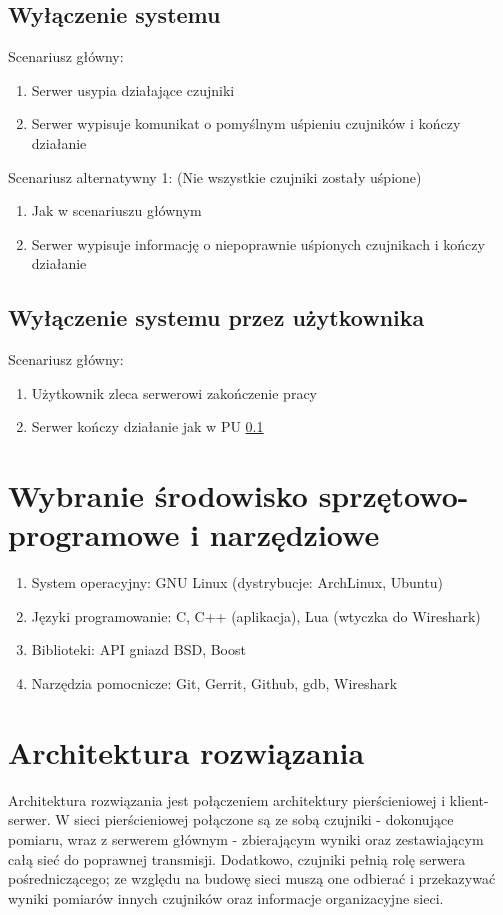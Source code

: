 \documentclass[a4paper,11pt]{article}
\begin{document}
\subsection{Wyłączenie systemu}\label{turnoff}
Scenariusz główny:
\begin{enumerate}
   \item Serwer usypia działające czujniki
   \item Serwer wypisuje komunikat o pomyślnym uśpieniu czujników i kończy działanie
\end{enumerate}
Scenariusz alternatywny 1: (Nie wszystkie czujniki zostały uśpione)
\begin{enumerate}
   \item Jak w scenariuszu głównym
   \item Serwer wypisuje informację o niepoprawnie uśpionych czujnikach i kończy działanie
\end{enumerate}

\subsection{Wyłączenie systemu przez użytkownika}
Scenariusz główny:
\begin{enumerate}
   \item Użytkownik zleca serwerowi zakończenie pracy
   \item Serwer kończy działanie jak w PU \ref{turnoff}
\end{enumerate}

\section{Wybranie środowisko sprzętowo-programowe i narzędziowe}

\begin{enumerate}
  \item System operacyjny: GNU Linux (dystrybucje: ArchLinux, Ubuntu)
  \item Języki programowanie: C, C++ (aplikacja), Lua (wtyczka do Wireshark)
  \item Biblioteki: API gniazd BSD, Boost
  \item Narzędzia pomocnicze: Git, Gerrit, Github, gdb, Wireshark
\end{enumerate}

\newpage
\section{Architektura rozwiązania}
Architektura rozwiązania jest połączeniem architektury pierścieniowej i klient-serwer. W sieci pierścieniowej połączone są ze sobą czujniki - dokonujące pomiaru, wraz z serwerem głównym - zbierającym wyniki oraz zestawiającym całą sieć do poprawnej transmisji. Dodatkowo, czujniki pełnią rolę serwera pośredniczącego; ze względu na budowę sieci muszą one odbierać i przekazywać wyniki pomiarów innych czujników oraz informacje organizacyjne sieci.
\end{document}
